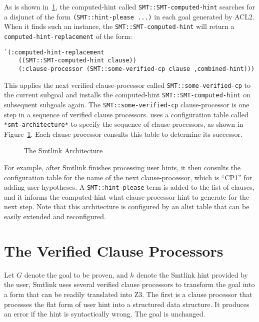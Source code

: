 As is shown in~\ref{fig:arch}, the computed-hint called
\texttt{SMT::SMT-computed-hint} searches for a disjunct of the form
\texttt{(SMT::hint-please ...)} in each goal generated by ACL2.
When it finds such an instance, the \texttt{SMT::SMT-computed-hint}
will return a \texttt{computed-hint-replacement} of the form:
\begin{lstlisting}[style=codestyle]
  `(:computed-hint-replacement
    ((SMT::SMT-computed-hint clause))
    (:clause-processor (SMT::some-verified-cp clause ,combined-hint)))
\end{lstlisting}
This applies the next verified clause-processor called
\texttt{SMT::some-verified-cp} to the current subgoal and installs the
computed-hint \texttt{SMT::SMT-computed-hint} on subsequent subgoals again.
The \texttt{SMT::some-verified-cp} clause-processor is one step in a sequence of
verified clause processors.
\smtlink{} uses a configuration table called \texttt{*smt-architecture*} to
specify the sequence of clause processors, as shown in Figure~\ref{fig:arch}.
Each clause processor consults this table to determine its successor.

\begin{figure}\begin{center}
  \resizebox{1.0\textwidth}{!}{}
  \caption{The Smtlink Architecture}\label{fig:arch}
\end{center}\end{figure}

For example, after Smtlink finishes processing user hints, it then consults the
configuration table for the name of the next clause-processor, which is ``CP1''
for adding user hypotheses.
A \texttt{SMT::hint-please} term is added to the list of clauses, and it informs
the computed-hint what clause-processor hint to generate for the next step.
Note that this architecture is configured by an alist table that can be easily
extended and reconfigured.

\section{The Verified Clause Processors}
Let $G$ denote the goal to be proven, and $h$ denote the Smtlink hint provided
by the user, Smtlink uses several verified clause processors to transform the
goal into a form that can be readily translated into Z3.
The first is a clause processor that processes the flat form of user hint into a
structured data structure.
It produces an error if the hint is syntactically wrong. The goal is unchanged.

